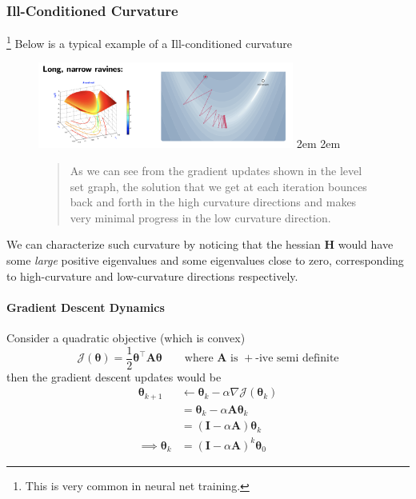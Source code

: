\documentclass[11pt]{article}
\begin{document}
\subsubsection{Ill-Conditioned Curvature}\footnote{This is very common in neural net training.}
Below is a typical example\cite{week4} of a Ill-conditioned curvature
\begin{figure}[H]
    \center \includegraphics[width=0.75\textwidth]{img/ravine}
    \advance\leftmargini 2em
    \advance\rightmargin 2em
    \begin{quotation}
        As we can see from the gradient updates shown in the level set graph, the solution that we get at each iteration bounces back and forth in the high curvature directions and makes very minimal progress in the low curvature direction. 
    \end{quotation}
\end{figure}
\noindent We can characterize such curvature by noticing that the hessian $\mathbf{H}$ would have some \textit{large} positive eigenvalues and some eigenvalues close to zero, corresponding to high-curvature and low-curvature directions respectively.

\paragraph{Gradient Descent Dynamics}
Consider a quadratic objective (which is convex)
\begin{equation}
    \mathcal{J}(\boldsymbol{\theta})=\frac{1}{2} \boldsymbol{\theta}^{\top} \boldsymbol{A} \boldsymbol{\theta} \quad\quad \text{where $\mathbf{A}$ is $+$-ive semi definite}
\end{equation}
then the gradient descent updates would be 
\begin{align}
    \boldsymbol{\theta}_{k + 1} 
    &\gets \boldsymbol{\theta}_k - \alpha \nabla \mathcal{J} (\boldsymbol{\theta}_k) \\
    &= \boldsymbol{\theta}_k - \alpha \mathbf{A} \boldsymbol{\theta}_k \\
    &= (\mathbf{I} - \alpha \mathbf{A})\boldsymbol{\theta}_k \\
    \implies \boldsymbol{\theta}_k &= (\mathbf{I} - \alpha \mathbf{A})^k \boldsymbol{\theta}_0
\end{align}
\end{document}
